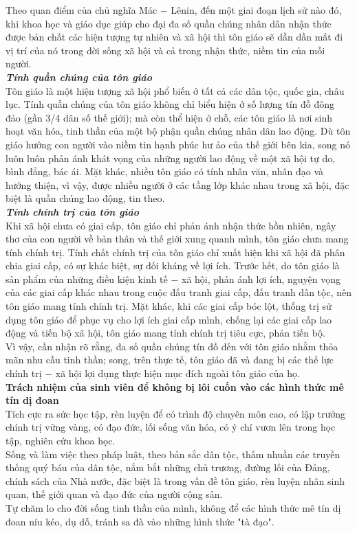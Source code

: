 Theo quan điểm của chủ nghĩa Mác $-$ Lênin, đến một giai đoạn lịch sử nào đó, khi khoa học và giáo dục giúp cho đại đa số quần chúng nhân dân nhận thức được bản chất các hiện tượng tự nhiên và xã hội thì tôn giáo sẽ dần dần mất đi vị trí của nó trong đời sống xã hội và cả trong nhận thức, niềm tin của mỗi người.\\
\textbf{\textit{Tính quần chúng của tôn giáo}}\\
Tôn giáo là một hiện tượng xã hội phổ biến ở tất cả các dân tộc, quốc gia, châu lục. Tính quần chúng của tôn giáo không chỉ biểu hiện ở số lượng tín đồ đông đảo (gần 3/4 dân số thế giới); mà còn thể hiện ở chỗ, các tôn giáo là nơi sinh hoạt văn hóa, tinh thần của một bộ phận quần chúng nhân dân lao động. Dù tôn giáo hướng con người vào niềm tin hạnh phúc hư ảo của thế giới bên kia, song nó luôn luôn phản ánh khát vọng của những người lao động về một xã hội tự do, bình đẳng, bác ái. Mặt khác, nhiều tôn giáo có tính nhân văn, nhân đạo và hướng thiện, vì vậy, được nhiều người ở các tầng lớp khác nhau trong xã hội, đặc biệt là quần chúng lao động, tin theo.\\
\textbf{\textit{Tính chính trị của tôn giáo}}\\
Khi xã hội chưa có giai cấp, tôn giáo chỉ phản ánh nhận thức hồn nhiên, ngây thơ của con người về bản thân và thế giới xung quanh mình, tôn giáo chưa mang tính chính trị. Tính chất chính trị của tôn giáo chỉ xuất hiện khi xã hội đã phân chia giai cấp, có sự khác biệt, sự đối kháng về lợi ích. Trước hết, do tôn giáo là sản phẩm của những điều kiện kinh tế $-$ xã hội, phản ánh lợi ích, nguyện vọng của các giai cấp khác nhau trong cuộc đấu tranh giai cấp, đấu tranh dân tộc, nên tôn giáo mang tính chính trị. Mặt khác, khi các giai cấp bóc lột, thống trị sử dụng tôn giáo để phục vụ cho lợi ích giai cấp mình, chống lại các giai cấp lao động và tiến bộ xã hội, tôn giáo mang tính chính trị tiêu cực, phản tiến bộ.\\
Vì vậy, cần nhận rõ rằng, đa số quần chúng tín đồ đến với tôn giáo nhằm thỏa mãn nhu cầu tinh thần; song, trên thực tế, tôn giáo đã và đang bị các thế lực chính trị $-$ xã hội lợi dụng thực hiện mục đích ngoài tôn giáo của họ.\\
\textbf{Trách nhiệm của sinh viên để không bị lôi cuốn vào các hình thức mê tín dị đoan}\\
Tích cực ra sức học tập, rèn luyện để có trình độ chuyên môn cao, có lập trưởng chính trị vững vàng, có đạo đức, lối sống văn hóa, có ý chí vươn lên trong học tập, nghiên cứu khoa học.\\
Sống và làm việc theo pháp luật, theo bản sắc dân tộc, thấm nhuần các truyền thống quý báu của dân tộc, nắm bắt những chủ trương, đường lối của Đảng, chính sách của Nhà nước, đặc biệt là trong vấn đề tôn giáo, rèn luyện nhân sinh quan, thế giới quan và đạo đức của người cộng sản.\\
Tự chăm lo cho đời sống tinh thần của mình, không để các hình thức mê tín dị đoan níu kéo, dụ dỗ, tránh sa đà vào những hình thức "tà đạo".